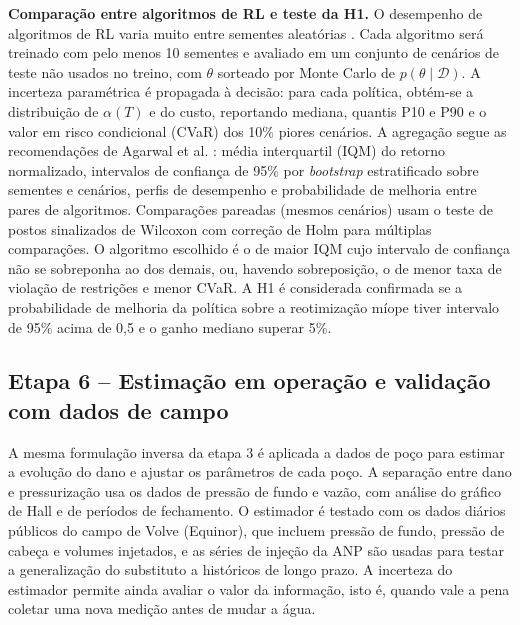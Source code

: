 \documentclass[11pt,a4paper]{article}
\begin{document}
\textbf{Comparação entre algoritmos de RL e teste da H1.} O desempenho de algoritmos de RL
varia muito entre sementes aleatórias \cite{henderson2018}. Cada algoritmo será treinado
com pelo menos 10 sementes e avaliado em um conjunto de cenários de teste não
usados no treino, com $\theta$ sorteado por Monte Carlo de $p(\theta\mid\mathcal{D})$. A
incerteza paramétrica é propagada à decisão: para cada política, obtém-se a distribuição
de $\alpha(T)$ e do custo, reportando mediana, quantis P10 e P90 e o valor em risco
condicional (CVaR) dos 10\% piores cenários. A agregação segue as recomendações de Agarwal
et al. \cite{agarwal2021}: média interquartil (IQM) do retorno normalizado, intervalos de
confiança de 95\% por \textit{bootstrap} estratificado sobre sementes e cenários, perfis
de desempenho e probabilidade de melhoria entre pares de algoritmos. Comparações pareadas
(mesmos cenários) usam o teste de postos sinalizados de Wilcoxon com correção de Holm para
múltiplas comparações. O algoritmo escolhido é o de maior IQM cujo intervalo de confiança
não se sobreponha ao dos demais, ou, havendo sobreposição, o de menor taxa de violação de
restrições e menor CVaR. A H1 é considerada confirmada se a probabilidade de melhoria da
política sobre a reotimização míope tiver intervalo de 95\% acima de 0,5 e o ganho mediano
superar 5\%.

\subsection{Etapa 6 -- Estimação em operação e validação com dados de campo}
A mesma formulação inversa da etapa 3 é aplicada a dados de poço para estimar a evolução
do dano e ajustar os parâmetros de cada poço. A separação entre dano e pressurização usa
os dados de pressão de fundo e vazão, com análise do gráfico de Hall e de períodos de
fechamento. O estimador é testado com os dados diários públicos do campo de Volve
(Equinor), que incluem pressão de fundo, pressão de cabeça e volumes injetados, e as
séries de injeção da ANP são usadas para testar a generalização do substituto a
históricos de longo prazo. A incerteza do estimador permite ainda avaliar o valor da
informação, isto é, quando vale a pena coletar uma nova medição antes de mudar a água.
\end{document}

